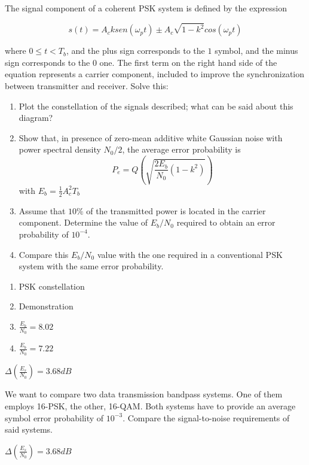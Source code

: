 \documentclass[es,boletin]{uah}
\begin{document}
{


	\cite{Haykin} The signal component of a coherent PSK system is defined by the expression

\begin{displaymath}
	s(t) =A_c k sen(\omega_p t) \pm A_c \sqrt{1-k^2} cos(\omega_p t)
\end{displaymath}

where $0 \leq t < T_b$, and the plus sign corresponds to the $1$ symbol, and the minus sign corresponds to the $0$ one. The first term on the right hand side of the equation represents a carrier component, included to improve the synchronization between transmitter and receiver. Solve this:

\begin{enumerate}
	\item Plot the constellation of the signals described; what can be said about this diagram?
	\item Show that, in presence of zero-mean additive white Gaussian noise with power spectral density $N_0/2$, the average error probability is
	\begin{displaymath}
		P_e = Q \left ( \sqrt{\frac{2E_b}{N_0} (1-k^2)} \right )
	\end{displaymath}
	with $E_b = \frac{1}{2} A_c^2 T_b$
	\item Assume that $10\%$ of the transmitted power is located in the carrier component. Determine the value of $E_b/N_0$ required to obtain an error probability of $10^{-4}$.
	\item Compare this $E_b/N_0$ value with the one required in a conventional PSK system with the same error probability.
\end{enumerate}

}
{
\begin{enumerate}
	\item PSK constellation
	\item Demonstration
	\item $\frac{E_b}{N_0} = 8.02$
	\item $\frac{E_b}{N_0} = 7.22$
\end{enumerate}

}


{

$\Delta \left ( \frac{E_s}{N_0} \right ) = 3.68 dB$
}
{

	\cite{Haykin} We want to compare two data transmission bandpass systems. One of them employs 16-PSK, the other, 16-QAM. Both systems have to provide an average symbol error probability of $10^{-3}$. Compare the signal-to-noise requirements of said systems.
}
{

$\Delta \left ( \frac{E_s}{N_0} \right ) = 3.68 dB$
}
\end{document}
